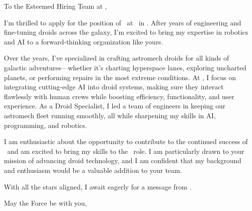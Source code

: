 \documentclass[10pt, a4paper]{article}
\begin{document}
To the Esteemed Hiring Team at \COMPANY,

\bigskip

I’m thrilled to apply for the position of \ROLE\ at \COMPANY\ in \CITY. After years of engineering and fine-tuning droids across the galaxy, I’m excited to bring my expertise in robotics and AI to a forward-thinking organization like yours.

Over the years, I’ve specialized in crafting astromech droids for all kinds of galactic adventures—whether it's charting hyperspace lanes, exploring uncharted planets, or performing repairs in the most extreme conditions. At \companyNow, I focus on integrating cutting-edge AI into droid systems, making sure they interact flawlessly with human crews while boosting efficiency, functionality, and user experience. As a Droid Specialist, I led a team of engineers in keeping our astromech fleet running smoothly, all while sharpening my skills in AI, programming, and robotics.

I am enthusiastic about the opportunity to contribute to the continued success of \COMPANY\ and am excited to bring my skills to the \ROLE\ role. I am particularly drawn to your mission of advancing droid technology, and I am confident that my background and enthusiasm would be a valuable addition to your team.

With all the stars aligned, I await eagerly for a message from \COMPANY.

\bigskip

May the Force be with you,

\vspace{10pt}

\name
\end{document}
